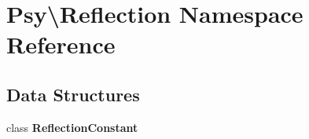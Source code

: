 \section{Psy\textbackslash{}Reflection Namespace Reference}
\label{namespace_psy_1_1_reflection}
\subsection*{Data Structures}
\begin{DoxyCompactItemize}
\item 
class {\bf Reflection\+Constant}
\end{DoxyCompactItemize}
